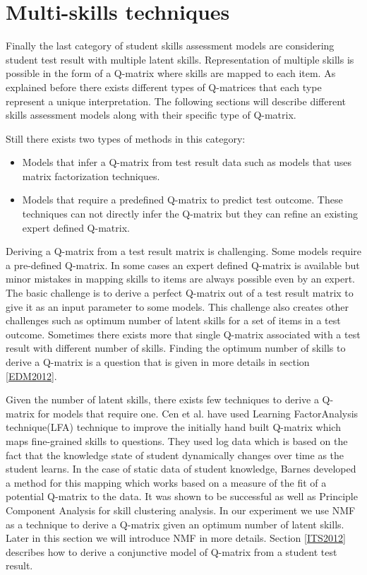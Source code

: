 \section{Multi-skills techniques}
\label{NMF_DESC}
Finally the last category of student skills assessment models are considering student test result with multiple latent skills. Representation of multiple skills is possible in the form of a Q-matrix where skills are mapped to each item. As explained before there exists different types of Q-matrices that each type represent a unique interpretation. The following sections will describe different skills assessment models along with their specific type of Q-matrix.


Still there exists two types of methods in this category: 
\begin{itemize}
\item Models that infer a Q-matrix from test result data such as models that uses matrix factorization techniques.
\item Models that require a predefined Q-matrix to predict test outcome. These techniques can not directly infer the Q-matrix but they can refine an existing expert defined Q-matrix.
\end{itemize}

Deriving a Q-matrix from a test result matrix is challenging. Some models require a pre-defined Q-matrix. In some cases an expert defined Q-matrix is available but minor mistakes in mapping skills to items are always possible even by an expert. The basic challenge is to derive a perfect Q-matrix out of a test result matrix to give it as an input parameter to some models. This challenge also creates other challenges  such as optimum number of latent skills for a set of items in a test outcome. Sometimes there exists more that single Q-matrix associated with a test result with different number of skills. Finding the optimum number of skills to derive a Q-matrix is a question that is given in more details in section \ref{EDM2012}. 

Given the number of latent skills, there exists few techniques to derive a Q-matrix for models that require one. Cen et al. \citep{Cen2005,Cen2006} have used Learning FactorAnalysis technique(LFA) technique to improve the initially hand built Q-matrix which maps fine-grained skills to questions. They used log data which is based on the fact that the knowledge state of student dynamically changes over time as the student learns. In the case of static data of student knowledge, Barnes \citep{Barnes06} developed a method for this mapping which works based on a measure of the fit of a potential Q-matrix to the data. It was shown to be successful as well as Principle Component Analysis for skill clustering analysis. In our experiment we use NMF as a technique to derive a Q-matrix given an optimum number of latent skills. Later in this section we will introduce NMF in more details. Section \ref{ITS2012} describes how to derive a conjunctive model of Q-matrix from a student test result.

